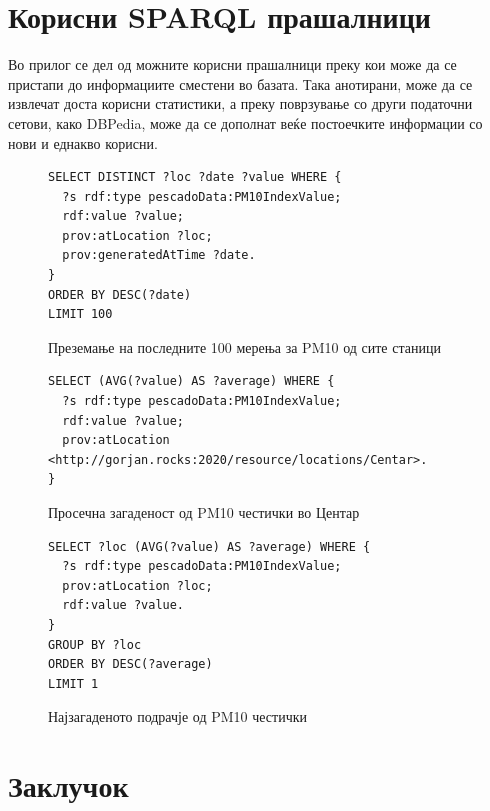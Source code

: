\documentclass{uvamscse}
\begin{document}
\chapter{Корисни SPARQL прашалници}

Во прилог се дел од можните корисни прашалници преку кои може да се пристапи до информациите сместени во базата. Така анотирани, може да се извлечат доста корисни статистики, а преку поврзување со други податочни сетови, како DBPedia, може да се дополнат веќе постоечките информации со нови и еднакво корисни.

\begin{figure}[H]
\centering
\begin{snippet}
\begin{verbatim}
SELECT DISTINCT ?loc ?date ?value WHERE {
  ?s rdf:type pescadoData:PM10IndexValue;
  rdf:value ?value;
  prov:atLocation ?loc;
  prov:generatedAtTime ?date.
}
ORDER BY DESC(?date)
LIMIT 100
\end{verbatim}
\end{snippet}
\caption{Преземање на последните 100 мерења за PM10 од сите станици}
\end{figure}

\begin{figure}[H]
\centering
\begin{snippet}
\begin{verbatim}
SELECT (AVG(?value) AS ?average) WHERE {
  ?s rdf:type pescadoData:PM10IndexValue;
  rdf:value ?value;
  prov:atLocation <http://gorjan.rocks:2020/resource/locations/Centar>.
}
\end{verbatim}
\end{snippet}
\caption{Просечна загаденост од PM10 честички во Центар}
\end{figure}

\begin{figure}[H]
\centering
\begin{snippet}
\begin{verbatim}
SELECT ?loc (AVG(?value) AS ?average) WHERE {
  ?s rdf:type pescadoData:PM10IndexValue;
  prov:atLocation ?loc;
  rdf:value ?value.
}
GROUP BY ?loc
ORDER BY DESC(?average)
LIMIT 1
\end{verbatim}
\end{snippet}
\caption{Најзагаденото подрачје од PM10 честички}
\end{figure}



\chapter{Заклучок}
\end{document}
